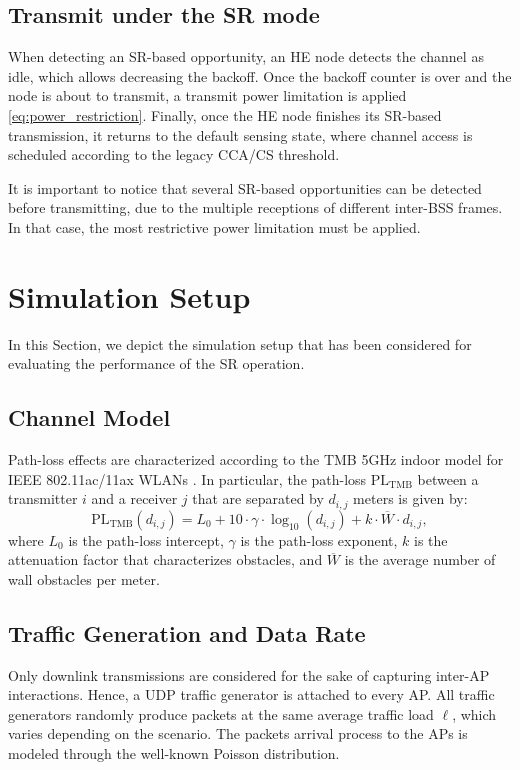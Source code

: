 \documentclass[conference]{IEEEtran}
\begin{document}
	\subsection{Transmit under the SR mode}
	When detecting an SR-based opportunity, an HE node detects the channel as idle, which allows decreasing the backoff. Once the backoff counter is over and the node is about to transmit, a transmit power limitation is applied \eqref{eq:power_restriction}. Finally, once the HE node finishes its SR-based transmission, it returns to the default sensing state, where channel access is scheduled according to the legacy CCA/CS threshold.
	
	It is important to notice that several SR-based opportunities can be detected before transmitting, due to the multiple receptions of different inter-BSS frames. In that case, the most restrictive power limitation must be applied. 
	
	\section{Simulation Setup}
	\label{section:simulation_setup}
	In this Section, we depict the simulation setup that has been considered for evaluating the performance of the SR operation.%
	
	\subsection{Channel Model}
	Path-loss effects are characterized according to the TMB 5GHz indoor model for IEEE 802.11ac/11ax WLANs \cite{tmb}. In particular, the path-loss $\text{PL}_\text{TMB}$ between a transmitter $i$ and a receiver $j$ that are separated by $d_{i,j}$ meters is given by:%
	\begin{equation}
	\text{PL}_\text{TMB}(d_{i,j}) = L_0 + 10 \cdot \gamma \cdot \log_{10}(d_{i,j}) + k \cdot \overline{W} \cdot d_{i,j},
	\label{eq:tmb}
	\nonumber
	\end{equation} 
	where  $L_0$ is the path-loss
    intercept, $\gamma$ is the path-loss exponent, $k$ is the attenuation factor that characterizes obstacles, and $\overline{W}$ is the average number of wall obstacles per meter.
	
	\subsection{Traffic Generation and Data Rate}
	Only downlink transmissions are considered for the sake of capturing inter-AP interactions. Hence, a UDP traffic generator is attached to every AP. All traffic generators randomly produce packets at the same average traffic load $\ell$, which varies depending on the scenario. The packets arrival process to the APs is modeled through the well-known Poisson distribution.
	
\end{document}
